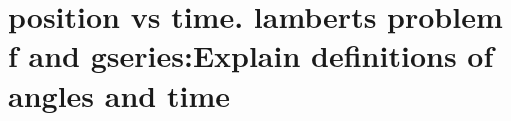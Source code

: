\section{ position vs time. lamberts problem f and gseries:Explain definitions of angles and time  }\label{sec:q4}    
